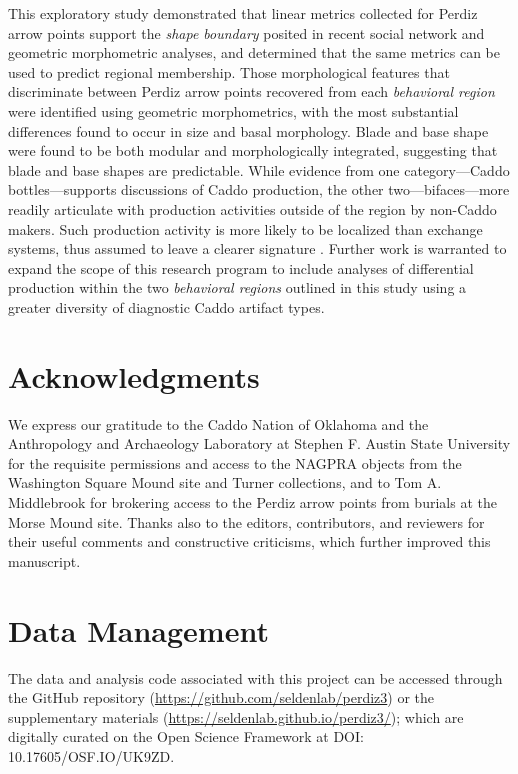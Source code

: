 \documentclass[smallextended]{svjour3}       %
\begin{document}
This exploratory study demonstrated that linear metrics collected for
Perdiz arrow points support the \emph{shape boundary} posited in recent
social network and geometric morphometric analyses, and determined that
the same metrics can be used to predict regional membership. Those
morphological features that discriminate between Perdiz arrow points
recovered from each \emph{behavioral region} were identified using
geometric morphometrics, with the most substantial differences found to
occur in size and basal morphology. Blade and base shape were found to
be both modular and morphologically integrated, suggesting that blade
and base shapes are predictable. While evidence from one
category---Caddo bottles---supports discussions of Caddo production, the
other two---bifaces---more readily articulate with production activities
outside of the region by non-Caddo makers. Such production activity is
more likely to be localized than exchange systems, thus assumed to leave
a clearer signature \cite{RN7019}. Further work is warranted to expand
the scope of this research program to include analyses of differential
production within the two \emph{behavioral regions} outlined in this
study using a greater diversity of diagnostic Caddo artifact types.

\hypertarget{acknowledgments}{%
\section*{Acknowledgments}\label{acknowledgments}}

We express our gratitude to the Caddo Nation of Oklahoma and the
Anthropology and Archaeology Laboratory at Stephen F. Austin State
University for the requisite permissions and access to the NAGPRA
objects from the Washington Square Mound site and Turner collections,
and to Tom A. Middlebrook for brokering access to the Perdiz arrow
points from burials at the Morse Mound site. Thanks also to the editors,
contributors, and reviewers for their useful comments and constructive
criticisms, which further improved this manuscript.

\hypertarget{data-management}{%
\section*{Data Management}\label{data-management}}

The data and analysis code associated with this project can be accessed
through the GitHub repository
(\url{https://github.com/seldenlab/perdiz3}) or the supplementary
materials (\url{https://seldenlab.github.io/perdiz3/}); which are
digitally curated on the Open Science Framework at \newline DOI:
10.17605/OSF.IO/UK9ZD.




\end{document}
